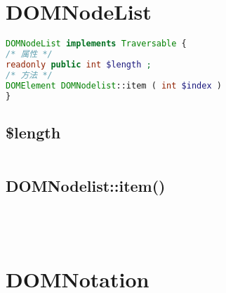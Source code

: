 \section{DOMNodeList}


\begin{lstlisting}[language=PHP]
DOMNodeList implements Traversable {
/* 属性 */
readonly public int $length ;
/* 方法 */
DOMElement DOMNodelist::item ( int $index )
}
\end{lstlisting}

\subsection{\$length}


\begin{lstlisting}[language=PHP]

\end{lstlisting}

\subsection{DOMNodelist::item()}



\begin{lstlisting}[language=PHP]

\end{lstlisting}


\begin{lstlisting}[language=PHP]

\end{lstlisting}


\begin{lstlisting}[language=PHP]

\end{lstlisting}


\begin{lstlisting}[language=PHP]

\end{lstlisting}
\section{DOMNotation}


